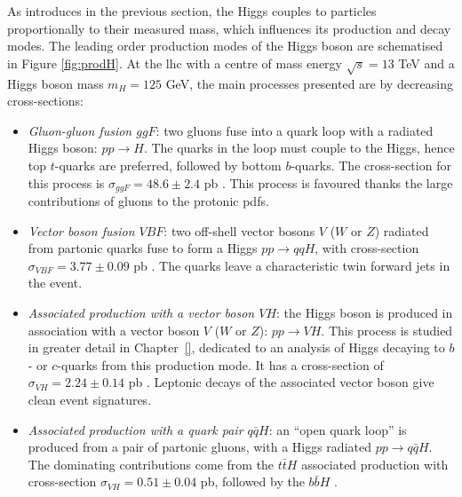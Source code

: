 As introduces in the previous section, the Higgs couples to particles proportionally to their measured mass, which influences its production and decay modes. The leading order production modes of the Higgs boson are schematised in Figure \ref{fig:prodH}. At the \gls{lhc} with a centre of mass energy $\sqrt{s} = 13$ TeV and a Higgs boson mass $m_H = 125$ GeV, the main processes presented are by decreasing cross-sections: 
\begin{itemize}[leftmargin=*] %
    \item \textit{Gluon-gluon fusion $ggF$}: two gluons fuse into a quark loop with a radiated Higgs boson: $pp \rightarrow H$. The quarks in the loop must couple to the Higgs, hence top $t$-quarks are preferred, followed by bottom $b$-quarks. The cross-section for this process is $\sigma_{ggF} = 48.6 \pm 2.4$ pb \cite{LHCHiggsCrossSectionWorkingGroup:2016ypw}. This process is favoured thanks the large contributions of gluons to the protonic \gls{pdf}s.
    \item \textit{Vector boson fusion $VBF$}: two off-shell vector bosons $V$ ($W$ or $Z$) radiated from partonic quarks fuse to form a Higgs $pp \rightarrow qqH$, with cross-section $\sigma_{VBF} = 3.77 \pm 0.09$ pb \cite{LHCHiggsCrossSectionWorkingGroup:2016ypw}. The quarks leave a characteristic twin forward jets in the event.
    \item \textit{Associated production with a vector boson $VH$}: the Higgs boson is produced in association with a vector boson $V$ ($W$ or $Z$): $pp \rightarrow VH$. This process is studied in greater detail in Chapter~\ref{}, dedicated to an analysis of Higgs decaying to $b$- or $c$-quarks from this production mode. It has a cross-section of $\sigma_{VH} = 2.24 \pm 0.14$ pb \cite{LHCHiggsCrossSectionWorkingGroup:2016ypw}. Leptonic decays of the associated vector boson give clean event signatures.
    \item \textit{Associated production with a quark pair $q\bar{q}H$}: an ``open quark loop'' is produced from a pair of partonic gluons, with a Higgs radiated $pp \rightarrow q\bar{q}H$. The dominating contributions come from the $t\bar{t}H$ associated production with cross-section $\sigma_{VH} = 0.51 \pm 0.04$ pb, followed by the $b\bar{b}H$ \cite{LHCHiggsCrossSectionWorkingGroup:2016ypw}.
\end{itemize}

